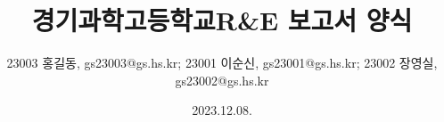 \title{경기과학고등학교\linebreak R\&E 보고서 양식}
\author{23003 홍길동, gs23003@gs.hs.kr; 23001 이순신, gs23001@gs.hs.kr; 23002 장영실, gs23002@gs.hs.kr}
\date{2023.12.08.}
